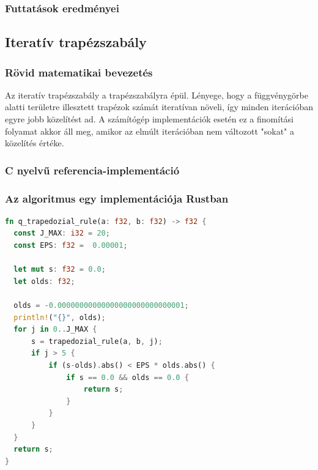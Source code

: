\subsubsection{Futtatások eredményei} %

\subsection{Iteratív trapézszabály}
\subsubsection{Rövid matematikai bevezetés}
Az iteratív trapézszabály a trapézszabályra épül. Lényege, hogy a függvénygörbe alatti területre illesztett trapézok számát iteratívan növeli, így minden iterációban egyre jobb közelítést ad. A számítógép implementációk esetén ez a finomítási folyamat akkor áll meg, amikor az elmúlt iterációban nem változott "sokat" a közelítés értéke.
\subsubsection{C nyelvű referencia-implementáció}
\subsubsection{Az algoritmus egy implementációja Rustban}
\begin{lstlisting}[language=Rust]
fn q_trapedozial_rule(a: f32, b: f32) -> f32 {
  const J_MAX: i32 = 20;
  const EPS: f32 =  0.00001;
  
  let mut s: f32 = 0.0;
  let olds: f32;
  
  olds = -0.00000000000000000000000000001;
  println!("{}", olds);
  for j in 0..J_MAX {
	  s = trapedozial_rule(a, b, j);
	  if j > 5 {
		  if (s-olds).abs() < EPS * olds.abs() {
			  if s == 0.0 && olds == 0.0 {
				  return s;
			  }
		  }
	  }
  }
  return s;
}
\end{lstlisting}

